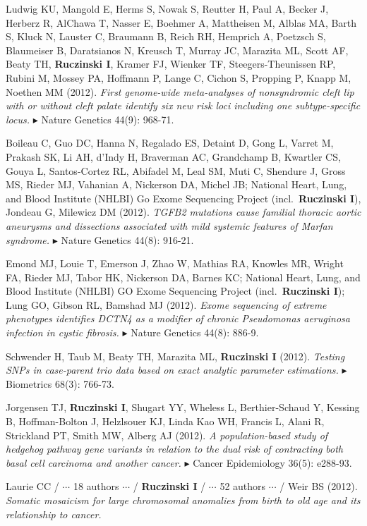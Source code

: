 \documentclass[10pt]{article}
\newcommand{\mine}{
  \addtocounter{enumi}{1}
\item[\fcolorbox{white}{grey}{\color{white} \tiny \arabic{enumi}}]
}
\newcommand{\dg}[1]{{\color{black} $\blacktriangleright$ {#1}}}
\begin{document}
\item  
Ludwig KU, Mangold E, Herms S, Nowak S, Reutter H, Paul A, Becker J, Herberz R, AlChawa T, Nasser E, Boehmer A, Mattheisen M, Alblas MA, Barth S, Kluck N, Lauster C, Braumann B, Reich RH, Hemprich A, Poetzsch S, Blaumeiser B, Daratsianos N, Kreusch T, Murray JC, Marazita ML, Scott AF, Beaty TH, {\bf Ruczinski I}, Kramer FJ, Wienker TF, Steegers-Theunissen RP, Rubini M, Mossey PA, Hoffmann P, Lange C, Cichon S, Propping P, Knapp M, Noethen MM (2012).
{\it First genome-wide meta-analyses of nonsyndromic cleft lip with or without cleft palate identify six new risk loci including one subtype-specific locus.}
\dg{Nature Genetics 44(9): 968-71.} 
\item
Boileau C, Guo DC, Hanna N, Regalado ES, Detaint D, Gong L, Varret M, Prakash SK, Li AH, d'Indy H, Braverman AC, Grandchamp B, Kwartler CS, Gouya L, Santos-Cortez RL, Abifadel M, Leal SM, Muti C, Shendure J, Gross MS, Rieder MJ, Vahanian A, Nickerson DA, Michel JB; National Heart, Lung, and Blood Institute (NHLBI) Go Exome Sequencing Project (incl.~{\bf Ruczinski I}), Jondeau G, Milewicz DM (2012).
{\it TGFB2 mutations cause familial thoracic aortic aneurysms and dissections associated with mild systemic features of Marfan syndrome.}
\dg{Nature Genetics 44(8): 916-21.}
\item
Emond MJ, Louie T, Emerson J, Zhao W, Mathias RA, Knowles MR, Wright FA, Rieder MJ, Tabor HK, Nickerson DA, Barnes KC; National Heart, Lung, and Blood Institute (NHLBI) GO Exome Sequencing Project (incl.~{\bf Ruczinski I}); Lung GO, Gibson RL, Bamshad MJ (2012).
{\it Exome sequencing of extreme phenotypes identifies DCTN4 as a modifier of chronic Pseudomonas aeruginosa infection in cystic fibrosis.}
\dg{Nature Genetics 44(8): 886-9.}
\mine
Schwender H, Taub M, Beaty TH, Marazita ML, {\bf Ruczinski I} (2012).
{\it Testing SNPs in case-parent trio data based on exact analytic parameter estimations.}
\dg{Biometrics 68(3): 766-73.}
\item
Jorgensen TJ, {\bf Ruczinski I}, Shugart YY, Wheless L, Berthier-Schaud Y, Kessing B, Hoffman-Bolton J, Helzlsouer KJ, Linda Kao WH, Francis L, Alani R, Strickland PT, Smith MW, Alberg AJ (2012).
{\it A population-based study of hedgehog pathway gene variants in relation to the dual risk of contracting both basal cell carcinoma and another cancer.}
\dg{Cancer Epidemiology 36(5): e288-93.}
\item
Laurie CC / $\cdots$ 18 authors $\cdots$ / {\bf Ruczinski I} / $\cdots$ 52 authors $\cdots$ / Weir BS (2012).
{\it Somatic mosaicism for large chromosomal anomalies from birth to old age and its relationship to cancer.}
\end{document}
